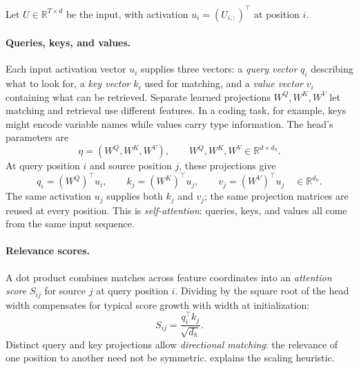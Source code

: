 \documentclass[11pt,twoside]{article}
\newcommand{\R}{\mathbb R}
\theoremstyle{plain}
\theoremstyle{definition}
\theoremstyle{remark}
\begin{document}
Let $U\in\R^{T\times d}$ be the input, with activation
$u_i=(U_{i,:})^\top$ at position $i$.

\paragraph{Queries, keys, and values.}
Each input activation vector $u_i$ supplies three vectors: a \emph{query vector} $q_i$ describing
what to look for, a \emph{key vector} $k_i$ used for matching, and a \emph{value vector} $v_i$ containing
what can be retrieved. Separate learned projections $W^Q,W^K,W^V$ let matching and retrieval use
different features. In a coding task, for example, keys might encode variable
names while values carry type information. The head's parameters are
\begin{equation}
\eta=(W^Q,W^K,W^V),
\qquad W^Q,W^K,W^V\in\R^{d\times d_h}.
\label{eq:head-parameters}
\end{equation}
At query position $i$ and source position $j$, these projections give
\[
q_i=(W^Q)^\top u_i,\qquad
k_j=(W^K)^\top u_j,\qquad
v_j=(W^V)^\top u_j
\quad\in\R^{d_h}.
\]
The same activation $u_j$ supplies both $k_j$ and $v_j$; the same projection
matrices are reused at every position. This is \emph{self-attention}:
queries, keys, and values all come from the same input sequence.

\paragraph{Relevance scores.}
A dot product combines matches across feature coordinates into an \emph{attention score}
$S_{ij}$ for source $j$ at query position $i$.
Dividing by the square root of the head width compensates for typical
score growth with width at initialization:
\[
S_{ij}=\frac{q_i^\top k_j}{\sqrt{d_h}}.
\]
Distinct query and key projections allow \emph{directional matching}: the
relevance of one position to another need not be symmetric.
 explains the scaling heuristic.
\end{document}
